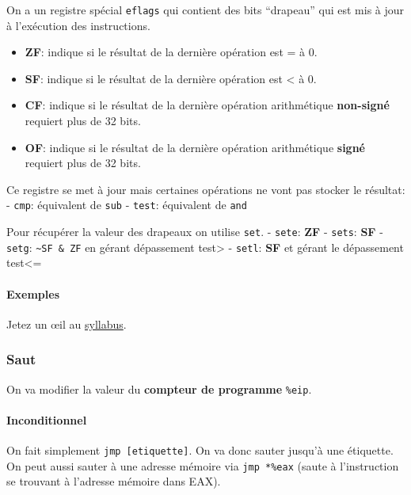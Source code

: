 On a un registre spécial \texttt{eflags} qui contient des bits
``drapeau'' qui est mis à jour à l'exécution des instructions.

\begin{itemize}
\tightlist
\item
  \textbf{ZF}: indique si le résultat de la dernière opération est = à
  0.
\item
  \textbf{SF}: indique si le résultat de la dernière opération est
  \textless{} à 0.
\item
  \textbf{CF}: indique si le résultat de la dernière opération
  arithmétique \textbf{non-signé} requiert plus de 32 bits.
\item
  \textbf{OF}: indique si le résultat de la dernière opération
  arithmétique \textbf{signé} requiert plus de 32 bits.
\end{itemize}

Ce registre se met à jour mais certaines opérations ne vont pas stocker
le résultat: - \texttt{cmp}: équivalent de \texttt{sub} - \texttt{test}:
équivalent de \texttt{and}

Pour récupérer la valeur des drapeaux on utilise \texttt{set}. -
\texttt{sete}: \textbf{ZF} - \texttt{sets}: \textbf{SF} - \texttt{setg}:
\texttt{\textasciitilde{}SF\ \&\ ZF} en gérant dépassement
test\textgreater{} - \texttt{setl}: \textbf{SF} et gérant le dépassement
test\textless=

\paragraph{Exemples}\label{exemples}

Jetez un œil au
\href{https://sites.uclouvain.be/SystInfo/notes/Theorie/Assembleur/memory.html}{syllabus}.

\subsubsection{Saut}\label{saut}

On va modifier la valeur du \textbf{compteur de programme}
\texttt{\%eip}.

\paragraph{Inconditionnel}\label{inconditionnel}

On fait simplement \texttt{jmp\ {[}etiquette{]}}. On va donc sauter
jusqu'à une étiquette. On peut aussi sauter à une adresse mémoire via
\texttt{jmp\ *\%eax} (saute à l'instruction se trouvant à l'adresse
mémoire dans EAX).

